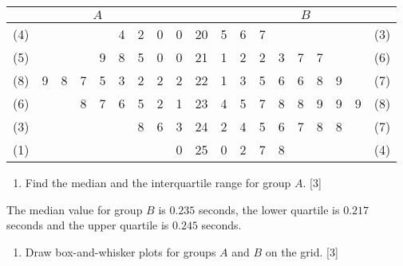 \documentclass[a4paper]{article}
\begin{document}
\begin{enumerate}
	\begin{table}[!htpb]
		\centering
		\setlength{\tabcolsep}{2.2mm}  %
		\begin{tabular}{cllllllll|l|cllllllll}
			\multicolumn{9}{c|}{$A$}              &    & \multicolumn{9}{c}{$B$}               \\ \hline
			(4) &   &   &   &   & 4 & 2 & 0 & 0 & 20 & 5 & 6 & 7 &   &   &   &   &   & (3) \\
			(5) &   &   &   & 9 & 8 & 5 & 0 & 0 & 21 & 1 & 2 & 2 & 3 & 7 & 7 &   &   & (6) \\
			(8) & 9 & 8 & 7 & 5 & 3 & 2 & 2 & 2 & 22 & 1 & 3 & 5 & 6 & 6 & 8 & 9 &   & (7) \\
			(6) &   &   & 8 & 7 & 6 & 5 & 2 & 1 & 23 & 4 & 5 & 7 & 8 & 8 & 9 & 9 & 9 & (8) \\
			(3) &   &   &   &   &   & 8 & 6 & 3 & 24 & 2 & 4 & 5 & 6 & 7 & 8 & 8 &   & (7) \\
			(1) &   &   &   &   &   &   &   & 0 & 25 & 0 & 2 & 7 & 8 &   &   &   &   & (4)
		\end{tabular}
		
		\vspace{4 pt}
		
		
	\end{table}
	
	\begin{enumerate}[label=(\roman*)]
		\item Find the median and the interquartile range for group $A$. \hfill[3]
		
		\vspace{4cm}
		
	\end{enumerate}
	
	The median value for group $B$ is $0.235$ seconds, the lower quartile is $0.217$ seconds and the upper
	quartile is $0.245$ seconds.
	
	\begin{enumerate}[resume,label=(\roman*)]
		\item Draw box-and-whisker plots for groups $A$ and $B$ on the grid. \hfill [3]
		
		
		\medskip
		\vspace{1cm}
		
		
		\begin{tikzpicture}
			\centering
			

\end{tikzpicture}
\end{enumerate}
\end{enumerate}
\end{document}
